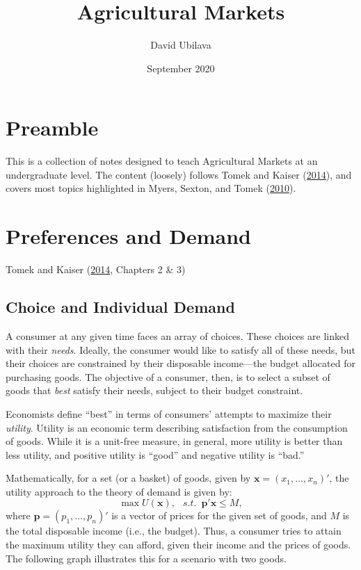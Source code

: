 \documentclass[
]{book}
\title{Agricultural Markets}
\author{David Ubilava}
\date{September 2020}
\begin{document}
\maketitle

{
\setcounter{tocdepth}{1}
\tableofcontents
}
\hypertarget{preamble}{%
\chapter*{Preamble}\label{preamble}}

This is a collection of notes designed to teach Agricultural Markets at an undergraduate level. The content (loosely) follows Tomek and Kaiser (\protect\hyperlink{ref-tomek2014}{2014}), and covers most topics highlighted in Myers, Sexton, and Tomek (\protect\hyperlink{ref-myers2010}{2010}).

\hypertarget{preferences-and-demand}{%
\chapter{Preferences and Demand}\label{preferences-and-demand}}

Tomek and Kaiser (\protect\hyperlink{ref-tomek2014}{2014}, Chapters 2 \& 3)

\hypertarget{choice-and-individual-demand}{%
\section{Choice and Individual Demand}\label{choice-and-individual-demand}}

A consumer at any given time faces an array of choices. These choices are linked with their \emph{needs}. Ideally, the consumer would like to satisfy all of these needs, but their choices are constrained by their disposable income---the budget allocated for purchasing goods. The objective of a consumer, then, is to select a subset of goods that \emph{best} satisfy their needs, subject to their budget constraint.

Economists define ``best'' in terms of consumers' attempts to maximize their \emph{utility}. Utility is an economic term describing satisfaction from the consumption of goods. While it is a unit-free measure, in general, more utility is better than less utility, and positive utility is ``good'' and negative utility is ``bad.''

Mathematically, for a set (or a basket) of goods, given by \(\mathbf{x}=(x_1,\ldots,x_n)'\), the utility approach to the theory of demand is given by: \[\max U(\mathbf{x}),\;~~s.t.\;~\mathbf{p}'\mathbf{x} \leq M,\] where \(\mathbf{p}=(p_1,\ldots,p_n)'\) is a vector of prices for the given set of goods, and \(M\) is the total disposable income (i.e., the budget). Thus, a consumer tries to attain the maximum utility they can afford, given their income and the prices of goods. The following graph illustrates this for a scenario with two goods.
\end{document}
